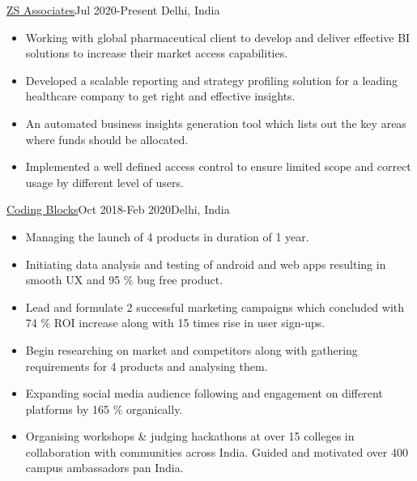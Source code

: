 \documentclass[10pt,a4paper,ragged2e]{altacv}
\begin{document}
 {\color{mecol}\href{https://www.zs.com/}{ZS Associates}}{Jul 2020-Present }{Delhi, India}
\begin{itemize}

\item {Working with global pharmaceutical client to develop
and deliver effective BI solutions to increase their market access
capabilities. }
\item {Developed a scalable reporting and strategy profiling solution for a leading healthcare company to get right and effective insights. }
\item {An automated business insights generation tool which lists out the key areas where funds should be allocated.}
\item {Implemented a well defined access control to ensure limited scope and correct usage by different level of users.}




\end{itemize}

 {\color{mecol}\href{https://codingblocks.com}{Coding Blocks}}{Oct 2018-Feb 2020}{Delhi, India}
\begin{itemize}
\item {Managing the launch of 4 products in duration of 1 year. }
\item {Initiating data analysis and testing of android and web apps resulting in smooth UX and 95 \% bug free product.}
\item { Lead and formulate 2 successful marketing campaigns which concluded with 74 \% ROI increase along with 15 times rise in user sign-ups.}
\item {Begin researching on market and competitors along with gathering requirements for 4 products and analysing them.}
\item {Expanding social media audience following and engagement on different platforms by 165 \% organically.}
\item {Organising workshops \& judging hackathons at over 15 colleges in collaboration with communities across India. Guided and motivated over 400 campus ambassadors pan India.}
\end{itemize}
\end{document}
